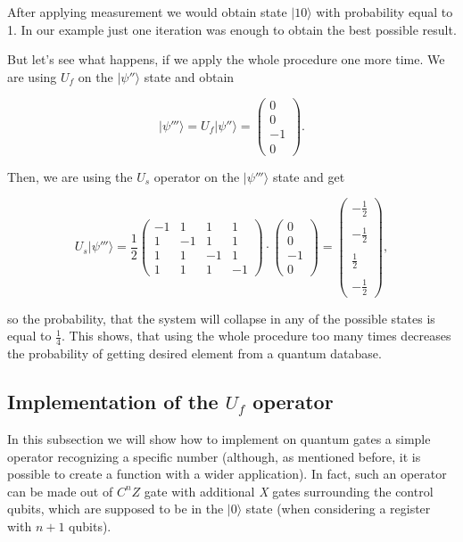 \begin{example}
After applying measurement we would obtain state $|10\rangle$ with probability equal to 1. In our example just one iteration was enough to obtain the best possible result.

But let's see what happens, if we apply the whole procedure one more time. We are using $U_f$ on the $|\psi''\rangle$ state and obtain

\[ |\psi'''\rangle = U_f |\psi''\rangle = \begin{pmatrix} 0 \\ 0 \\ -1 \\ 0 \end{pmatrix}. \]

Then, we are using the $U_s$ operator on the $|\psi'''\rangle$ state and get

\[ U_s|\psi'''\rangle = \frac{1}{2}\begin{pmatrix} -1 & 1 & 1 & 1 \\ 1 & -1 & 1 & 1 \\ 1 & 1 & -1 & 1 \\ 1 & 1 & 1 & -1 \end{pmatrix} \cdot \begin{pmatrix} 0 \\ 0 \\ -1 \\ 0 \end{pmatrix} = \begin{pmatrix} -\frac{1}{2} \\ \\ -\frac{1}{2} \\ \\ \frac{1}{2} \\ \\ -\frac{1}{2}  \end{pmatrix}, \]

so the probability, that the system will collapse in any of the possible states is equal to $\frac{1}{4}$. This shows, that using the whole procedure too many times decreases the probability of getting desired element from a quantum database.
\end{example}

\subsection{Implementation of the $U_f$ operator}

In this subsection we will show how to implement on quantum gates a simple operator recognizing a specific number (although, as mentioned before, it is possible to create a function with a wider application). In fact, such an operator can be made out of $C^nZ$ gate with additional \textit{X} gates surrounding the control qubits, which are supposed to be in the $|0\rangle$ state (when considering a register with $n + 1$ qubits).

